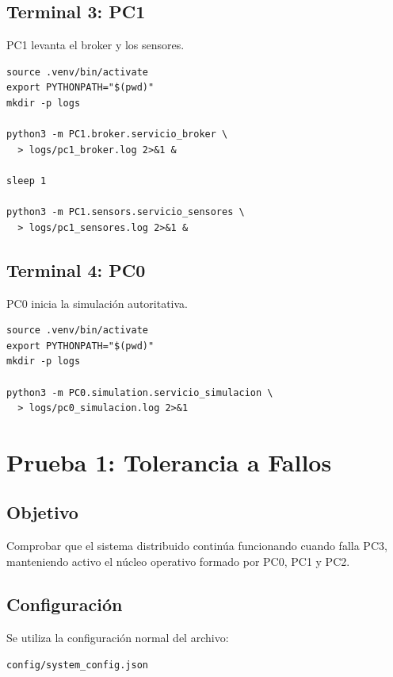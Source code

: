 \documentclass[12pt, a4paper]{article}
\begin{document}
\subsection{Terminal 3: PC1}

PC1 levanta el broker y los sensores.

\begin{verbatim}
source .venv/bin/activate
export PYTHONPATH="$(pwd)"
mkdir -p logs

python3 -m PC1.broker.servicio_broker \
  > logs/pc1_broker.log 2>&1 &

sleep 1

python3 -m PC1.sensors.servicio_sensores \
  > logs/pc1_sensores.log 2>&1 &
\end{verbatim}

\subsection{Terminal 4: PC0}

PC0 inicia la simulación autoritativa.

\begin{verbatim}
source .venv/bin/activate
export PYTHONPATH="$(pwd)"
mkdir -p logs

python3 -m PC0.simulation.servicio_simulacion \
  > logs/pc0_simulacion.log 2>&1
\end{verbatim}

\section{Prueba 1: Tolerancia a Fallos}

\subsection{Objetivo}

Comprobar que el sistema distribuido continúa funcionando cuando falla PC3, manteniendo activo el núcleo operativo formado por PC0, PC1 y PC2.

\subsection{Configuración}

Se utiliza la configuración normal del archivo:

\begin{center}
    \texttt{config/system\_config.json}
\end{center}
\end{document}
